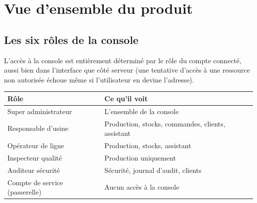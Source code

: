 \documentclass[11pt,a4paper]{report}
\begin{document}
\chapter{Vue d'ensemble du produit}

\section{Les six rôles de la console}
L'accès à la console est entièrement déterminé par le rôle du compte connecté,
aussi bien dans l'interface que côté serveur (une tentative d'accès à une
ressource non autorisée échoue même si l'utilisateur en devine l'adresse).

\begin{center}
\begin{tabular}{@{}ll@{}}
\toprule
\textbf{Rôle} & \textbf{Ce qu'il voit} \\
\midrule
Super administrateur & L'ensemble de la console \\
Responsable d'usine & Production, stocks, commandes, clients, assistant \\
Opérateur de ligne & Production, stocks, assistant \\
Inspecteur qualité & Production uniquement \\
Auditeur sécurité & Sécurité, journal d'audit, clients \\
Compte de service (passerelle) & Aucun accès à la console \\
\bottomrule
\end{tabular}
\end{center}
\end{document}
